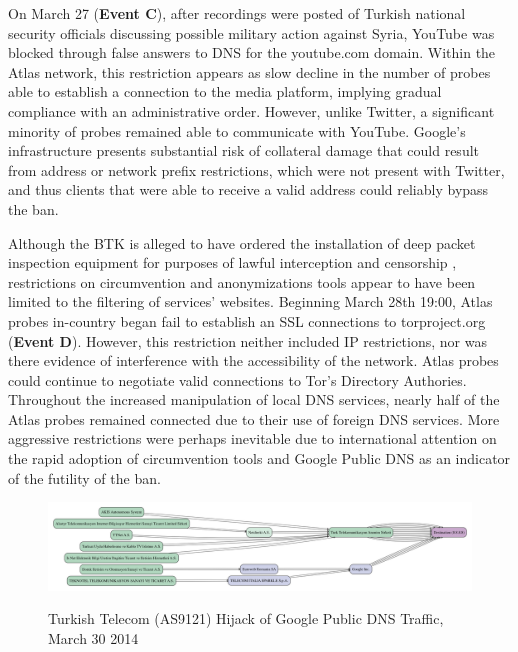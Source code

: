 On March 27 (\textbf{Event C}), after recordings were posted of Turkish national security officials discussing possible military action against Syria, YouTube was blocked through false answers to DNS for the youtube.com domain. Within the Atlas network, this restriction appears as slow decline in the number of probes able to establish a connection to the media platform, implying gradual compliance with an administrative order. However, unlike Twitter, a significant minority of probes remained able to communicate with YouTube. Google's infrastructure presents substantial risk of collateral damage that could result from address or network prefix restrictions, which were not present with Twitter, and thus clients that were able to receive a valid address could reliably bypass the ban.

Although the BTK is alleged to have ordered the installation of deep packet inspection equipment for purposes of lawful interception and censorship \cite{kirlidog2011deep}, restrictions on circumvention and anonymizations tools appear to have been limited to the filtering of services' websites. Beginning March 28th 19:00, Atlas probes in-country began fail to establish an SSL connections to torproject.org (\textbf{Event D}). However, this restriction neither included IP restrictions, nor was there evidence of interference with the accessibility of the network. Atlas probes could continue to negotiate valid connections to Tor's Directory Authories. Throughout the increased manipulation of local DNS services, nearly half of the Atlas probes remained connected due to their use of foreign DNS services. More aggressive restrictions were perhaps inevitable due to international attention on the rapid adoption of circumvention tools and Google Public DNS as an indicator of the futility of the ban.

\begin{figure}
  \includegraphics[width=\textwidth]{resources/traceroute-TR-google_public_dns-20140330-hijack.png}
  \label{image:tr-ttnet_hijack}
  \caption{Turkish Telecom (AS9121) Hijack of Google Public DNS Traffic, March 30 2014}
\end{figure}

